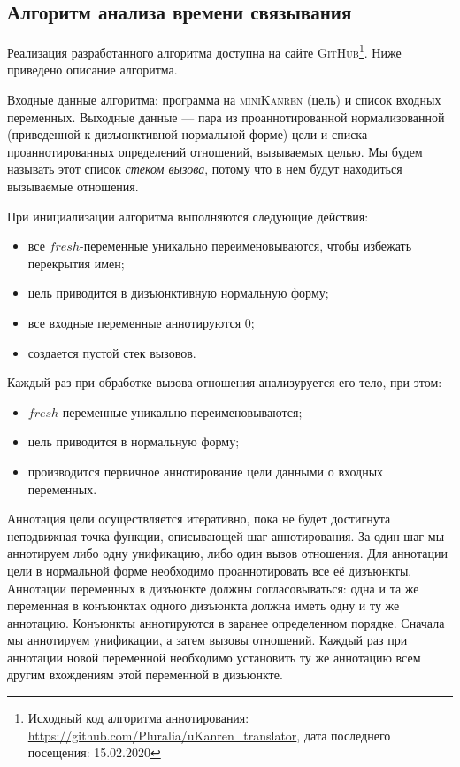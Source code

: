 \documentclass[conference,a4paper,american,russian]{IEEEtran}
\newcommand{\miniKanren}{\textsc{miniKanren}}
\newcommand{\github}{\textsc{GitHub}}
\begin{document}
\subsection{Алгоритм анализа времени связывания}

Реализация разработанного алгоритма доступна на сайте \github{}\footnote{Исходный код алгоритма аннотирования: \url{https://github.com/Pluralia/uKanren\_translator}, дата последнего посещения: 15.02.2020}. Ниже приведено описание алгоритма.

Входные данные алгоритма: программа на \miniKanren{} (цель) и список входных переменных.
Выходные данные --- пара из проаннотированной нормализованной (приведенной к дизъюнктивной нормальной форме) цели и списка проаннотированных определений отношений, вызываемых целью. 
Мы будем называть этот список \emph{стеком вызова}, потому что в нем будут находиться вызываемые отношения.

При инициализации алгоритма выполняются следующие действия: 
\begin{itemize}
    \item все $fresh$-переменные уникально переименовываются, чтобы избежать перекрытия имен;
    \item цель приводится в дизъюнктивную нормальную форму;
    \item все входные переменные аннотируются $0$;
    \item создается пустой стек вызовов.
\end{itemize}

Каждый раз при обработке вызова отношения анализуруется его тело, при этом: 
\begin{itemize}
    \item $fresh$-переменные уникально переименовываются;
    \item цель приводится в нормальную форму;
    \item производится первичное аннотирование цели данными о входных переменных.
\end{itemize}

Аннотация цели осуществляется итеративно, пока не будет достигнута неподвижная точка функции, описывающей шаг аннотирования. 
За один шаг мы аннотируем либо одну унификацию, либо один вызов отношения. 
Для аннотации цели в нормальной форме необходимо проаннотировать все её дизъюнкты. 
Аннотации переменных в дизъюнкте должны согласовываться: одна и та же переменная в конъюнктах одного дизъюнкта должна иметь одну и ту же аннотацию.
Конъюнкты аннотируются в заранее определенном порядке. 
Сначала мы аннотируем унификации, а затем вызовы отношений. 
Каждый раз при аннотации новой переменной необходимо установить ту же аннотацию всем другим вхождениям этой переменной в дизъюнкте. 
\end{document}
